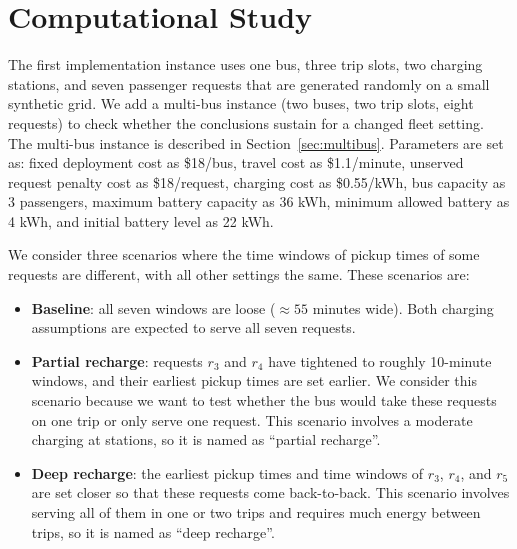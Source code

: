 \documentclass[11pt]{article}
\begin{document}


\section{Computational Study}

The first implementation instance uses one bus, three trip slots, two charging stations, and seven passenger requests that are generated randomly on a small synthetic grid. We add a multi-bus instance (two buses, two trip slots, eight requests) to check whether the conclusions sustain for a changed fleet setting. The multi-bus instance is described in Section~\ref{sec:multibus}. Parameters are set as: fixed deployment cost as \$18/bus, travel cost as \$1.1/minute, unserved request penalty cost as \$18/request, charging cost as \$0.55/kWh, bus capacity as 3 passengers, maximum battery capacity as 36 kWh, minimum allowed battery as 4 kWh, and initial battery level as 22 kWh. 

We consider three scenarios where the time windows of pickup times of some requests are different, with all other settings the same. These scenarios are:
\begin{itemize}
    \item \textbf{Baseline}: all seven windows are loose ($\approx 55$ minutes wide). Both charging assumptions are expected to serve all seven requests.
    \item \textbf{Partial recharge}: requests \(r_3\) and \(r_4\) have tightened to roughly 10-minute windows, and their earliest pickup times are set earlier. We consider this scenario because we want to test whether the bus would take these requests on one trip or only serve one request. This scenario involves a moderate charging at stations, so it is named as ``partial recharge''.
    \item \textbf{Deep recharge}: the earliest pickup times and time windows of \(r_3\), \(r_4\), and \(r_5\) are set closer so that these requests come back-to-back. This scenario involves serving all of them in one or two trips and requires much energy between trips, so it is named as ``deep recharge''.
\end{itemize}
\end{document}
